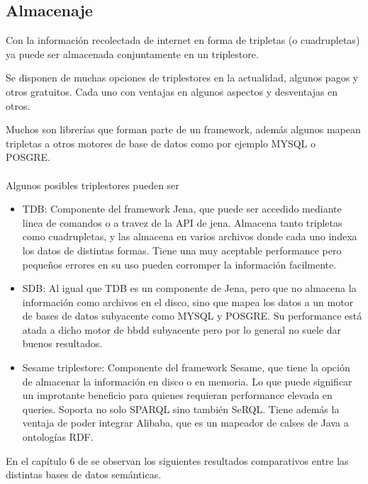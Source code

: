\subsection{Almacenaje}

Con la información recolectada de internet en forma de tripletas (o cuadrupletas) ya puede ser almacenada conjuntamente en un triplestore. 

Se disponen de muchas opciones de triplestores en la actualidad, algunos pagos y otros gratuitos. Cada uno con ventajas en algunos aspectos y desventajas en otros.

Muchos son librerías que forman parte de un framework, además algunos mapean tripletas a otros motores de base de datos como por ejemplo MYSQL o POSGRE.
\\\\
Algunos posibles triplestores pueden ser
\begin{itemize}
\item TDB: Componente del framework Jena, que puede ser accedido mediante linea de comandos o a travez de la API de jena. Almacena tanto tripletas como cuadrupletas, y las almacena en varios archivos donde cada uno indexa los datos de distintas formas. Tiene una muy aceptable performance pero pequeños errores en su uso pueden corromper la información facilmente.

\item SDB: Al igual que TDB es un componente de Jena, pero que no almacena la información como archivos en el disco, sino que mapea los datos a un motor de bases de datos subyacente como MYSQL y POSGRE. Su performance está atada a dicho motor de bbdd subyacente pero por lo general no suele dar buenos resultados. 

\item Sesame triplestore: Componente del framework Sesame, que tiene la opción de almacenar la información en disco o en memoria. Lo que puede significar un improtante beneficio para quienes requieran performance elevada en queries. Soporta no solo SPARQL sino también SeRQL. Tiene además la ventaja de poder integrar Alibaba, que es un mapeador de calses de Java a ontologías RDF.
\end{itemize}

\noindent En el capítulo 6 de \cite{Bizer2001} se observan los siguientes resultados comparativos entre las distintas bases de 
datos semánticas.

